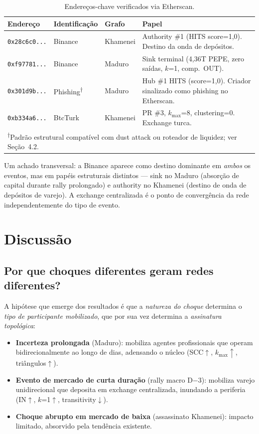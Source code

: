 \documentclass[12pt,a4paper]{article}
\begin{document}
\begin{table}[H]
\centering
\caption{Endereços-chave verificados via Etherscan.}
\label{tab:agentes}
\small
\begin{tabular}{p{2.5cm}llp{5.5cm}}
\toprule
Endereço & Identificação & Grafo & Papel \\
\midrule
\texttt{0x28c6c0...} & Binance & Khamenei & Authority \#1 (HITS score=1,0). Destino da onda de depósitos. \\
\texttt{0xf97781...} & Binance & Maduro & Sink terminal (4,36T PEPE, zero saídas, $k$=1, comp.\ OUT). \\
\texttt{0x301d9b...} & Phishing\textsuperscript{$\dagger$} & Maduro & Hub \#1 HITS (score=1,0). Criador sinalizado como phishing no Etherscan. \\
\texttt{0xb334a6...} & BtcTurk & Khamenei & PR \#3, $k_{\max}$=8, clustering=0. Exchange turca. \\
\bottomrule
\multicolumn{4}{l}{\footnotesize \textsuperscript{$\dagger$}Padrão estrutural compatível com dust attack ou roteador de liquidez; ver Seção~4.2.}
\end{tabular}
\end{table}

Um achado transversal: a Binance aparece como destino dominante em \textit{ambos} os eventos, mas em papéis estruturais distintos --- sink no Maduro (absorção de capital durante rally prolongado) e authority no Khamenei (destino de onda de depósitos de varejo). A exchange centralizada é o ponto de convergência da rede independentemente do tipo de evento.

\section{Discussão}

\subsection{Por que choques diferentes geram redes diferentes?}

A hipótese que emerge dos resultados é que a \textit{natureza do choque} determina o \textit{tipo de participante mobilizado}, que por sua vez determina a \textit{assinatura topológica}:

\begin{itemize}[nosep]
\item \textbf{Incerteza prolongada} (Maduro): mobiliza agentes profissionais que operam bidirecionalmente ao longo de dias, adensando o núcleo (SCC$\uparrow$, $k_{\max}\uparrow$, triângulos$\uparrow$).
\item \textbf{Evento de mercado de curta duração} (rally macro D$-$3): mobiliza varejo unidirecional que deposita em exchange centralizada, inundando a periferia (IN$\uparrow$, $k$=1$\uparrow$, transitivity$\downarrow$).
\item \textbf{Choque abrupto em mercado de baixa} (assassinato Khamenei): impacto limitado, absorvido pela tendência existente.
\end{itemize}
\end{document}
